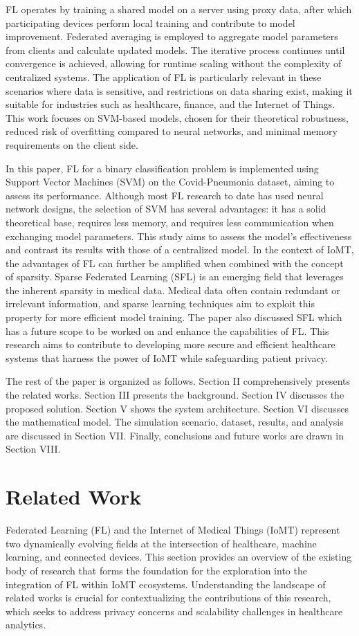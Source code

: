 \documentclass[conference]{IEEEtran}
\begin{document}
FL\cite{3} operates by training a shared model on a server using proxy data, after which participating devices perform local training and contribute to model improvement. Federated averaging is employed to aggregate model parameters from clients and calculate updated models. The iterative process continues until convergence is achieved, allowing for runtime scaling without the complexity of centralized systems. The application of FL\cite{4} is particularly relevant in these scenarios where data is sensitive, and restrictions on data sharing exist, making it suitable for industries such as healthcare, finance, and the Internet of Things. This work focuses on SVM-based models, chosen for their theoretical robustness, reduced risk\cite{5} of overfitting compared to neural networks, and minimal memory requirements on the client side.

In this paper, FL for a binary classification problem is implemented using Support Vector Machines (SVM) on the Covid-Pneumonia dataset, aiming to assess its performance. Although most FL research to date has used neural network designs, the selection of SVM has several advantages: it has a solid theoretical base, requires less memory, and requires less communication when exchanging model parameters. This study aims to assess the model's effectiveness and contrast its results with those of a centralized model.
In the context of IoMT\cite{6}, the advantages of FL can further be amplified when combined with the concept of sparsity. Sparse Federated Learning (SFL) is an emerging field that leverages the inherent sparsity in medical data. Medical data often contain redundant or irrelevant information, and sparse learning techniques aim to exploit this property for more efficient model training. The paper also discussed SFL which has a future scope to be worked on and enhance the capabilities of FL. This research aims to contribute to developing more secure and efficient healthcare systems that harness the power of IoMT while safeguarding patient privacy.

The rest of the paper is organized as follows. Section II comprehensively presents the related works. Section III presents the background. Section IV discusses the proposed solution. Section V shows the system architecture. Section VI discusses the mathematical model. The simulation scenario, dataset, results, and analysis are discussed in Section VII. Finally, conclusions and future works are drawn in Section VIII.



\section{Related Work}
Federated Learning (FL) and the Internet of Medical Things (IoMT)\cite{4}  represent two dynamically evolving fields at the intersection of healthcare, machine learning, and connected devices. This section provides an overview of the existing body of research that forms the foundation for the exploration into the integration of FL within IoMT ecosystems. Understanding the landscape of related works is crucial for contextualizing the contributions of this research, which seeks to address privacy concerns and scalability challenges in healthcare analytics.
\end{document}
